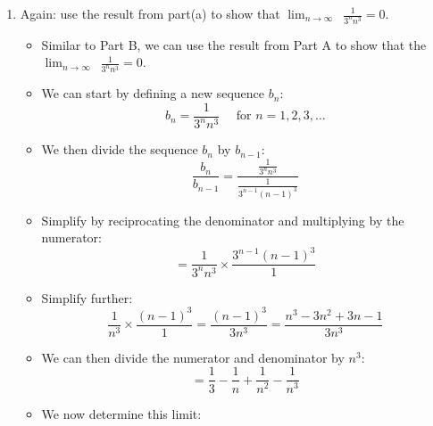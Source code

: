 \documentclass[12pt]{report}
\begin{document}
\begin{enumerate}[leftmargin=\labelsep]
\begin{enumerate}
\begin{tcolorbox}
                \end{tcolorbox}
\newpage
            \item Again: use the result from part(a) to show that $\displaystyle{\lim_{n \to \infty}}\,\,\, \frac{1}{3^nn^3}=0$.
                    \begin{tcolorbox}
                        \begin{itemize}[label={}]
                            \item Similar to Part B, we can use the result from Part A to show that the $\displaystyle{\lim_{n \to \infty}}\,\,\, \frac{1}{3^nn^3}=0$.
                            \item We can start by defining a new sequence $b_n$:
                            \begin{equation*}
                                b_n = \frac{1}{3^nn^3} \quad \text{ for } n=1,2,3,\dots
                            \end{equation*}
                            \item We then divide the sequence $b_n$ by $b_{n-1}$:
                            \begin{equation*} \frac{b_n}{b_{n-1}} = \frac{\frac{1}{3^nn^3}}{\frac{1}{3^{n-1}(n-1)^3}} 
                            \end{equation*}
                            \item Simplify by reciprocating the denominator and multiplying by the numerator:
                            \begin{equation*}
                                = \frac{1}{3^nn^3} \times \frac{3^{n-1}(n-1)^3}{1}
                            \end{equation*}
                            \item Simplify further:
                            \begin{equation*}
                               \frac{1}{n^3} \times \frac{(n-1)^3}{1} = \frac{(n-1)^3}{3n^3} = \frac{n^3-3n^2+3n-1}{3n^3} 
                            \end{equation*}
                            \item We can then divide the numerator and denominator by $n^3$:
                            \begin{equation*}
                                = \frac{1}{3} - \frac{1}{n} + \frac{1}{n^2} - \frac{1}{n^3}
                            \end{equation*}
                            \item We now determine this limit:

\end{itemize}
\end{tcolorbox}
\end{enumerate}
\end{enumerate}
\end{document}
